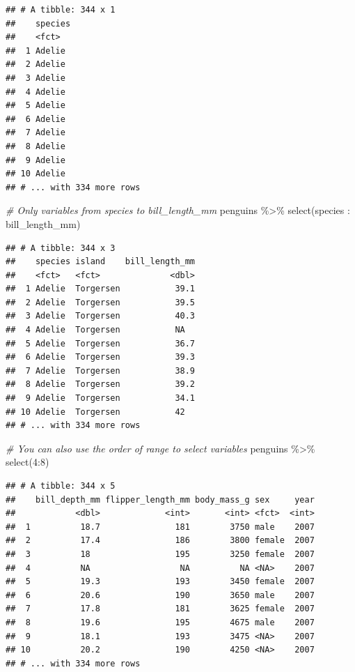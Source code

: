 \documentclass[
]{article}
\newenvironment{Shaded}{\begin{snugshade}}{\end{snugshade}}
\newcommand{\CommentTok}[1]{\textcolor[rgb]{0.56,0.35,0.01}{\textit{#1}}}
\newcommand{\DecValTok}[1]{\textcolor[rgb]{0.00,0.00,0.81}{#1}}
\newcommand{\FunctionTok}[1]{\textcolor[rgb]{0.00,0.00,0.00}{#1}}
\newcommand{\NormalTok}[1]{#1}
\newcommand{\SpecialCharTok}[1]{\textcolor[rgb]{0.00,0.00,0.00}{#1}}
\begin{document}
\begin{verbatim}
## # A tibble: 344 x 1
##    species
##    <fct>  
##  1 Adelie 
##  2 Adelie 
##  3 Adelie 
##  4 Adelie 
##  5 Adelie 
##  6 Adelie 
##  7 Adelie 
##  8 Adelie 
##  9 Adelie 
## 10 Adelie 
## # ... with 334 more rows
\end{verbatim}

\begin{Shaded}
\begin{Highlighting}[]
\CommentTok{\# Only variables from species to bill\_length\_mm}
\NormalTok{penguins }\SpecialCharTok{\%\textgreater{}\%} 
  \FunctionTok{select}\NormalTok{(species }\SpecialCharTok{:}\NormalTok{ bill\_length\_mm)}
\end{Highlighting}
\end{Shaded}

\begin{verbatim}
## # A tibble: 344 x 3
##    species island    bill_length_mm
##    <fct>   <fct>              <dbl>
##  1 Adelie  Torgersen           39.1
##  2 Adelie  Torgersen           39.5
##  3 Adelie  Torgersen           40.3
##  4 Adelie  Torgersen           NA  
##  5 Adelie  Torgersen           36.7
##  6 Adelie  Torgersen           39.3
##  7 Adelie  Torgersen           38.9
##  8 Adelie  Torgersen           39.2
##  9 Adelie  Torgersen           34.1
## 10 Adelie  Torgersen           42  
## # ... with 334 more rows
\end{verbatim}

\begin{Shaded}
\begin{Highlighting}[]
\CommentTok{\# You can also use the order of range to select variables}
\NormalTok{penguins }\SpecialCharTok{\%\textgreater{}\%} 
  \FunctionTok{select}\NormalTok{(}\DecValTok{4}\SpecialCharTok{:}\DecValTok{8}\NormalTok{)}
\end{Highlighting}
\end{Shaded}

\begin{verbatim}
## # A tibble: 344 x 5
##    bill_depth_mm flipper_length_mm body_mass_g sex     year
##            <dbl>             <int>       <int> <fct>  <int>
##  1          18.7               181        3750 male    2007
##  2          17.4               186        3800 female  2007
##  3          18                 195        3250 female  2007
##  4          NA                  NA          NA <NA>    2007
##  5          19.3               193        3450 female  2007
##  6          20.6               190        3650 male    2007
##  7          17.8               181        3625 female  2007
##  8          19.6               195        4675 male    2007
##  9          18.1               193        3475 <NA>    2007
## 10          20.2               190        4250 <NA>    2007
## # ... with 334 more rows
\end{verbatim}
\end{document}
